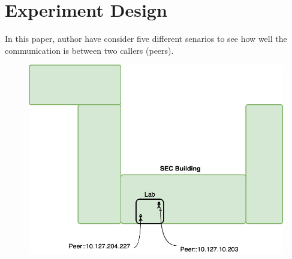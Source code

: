 \section{Experiment Design}	\label{sec:experiments}
	In this paper, author have consider five different senarios to see how well the communication is between two callers (peers). 
	\begin{figure}[thb]
		\begin{minipage}{\textwidth}
			\includegraphics[scale=0.29]{Images/experiment/senarios/in_lab.drawio.png}
		\end{minipage}
	\end{figure}